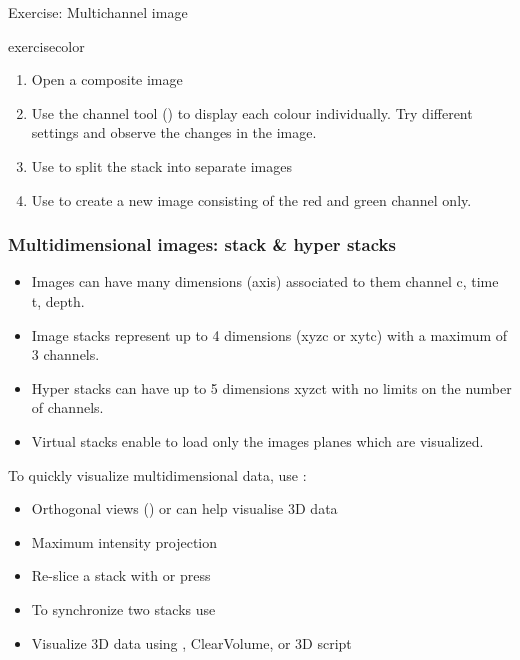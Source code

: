 \documentclass[ignorenonframetext,aspectratio=169,10pt,xcolor=table]{beamer}
\begin{document}
\begin{frame}{Exercise: Multichannel image}
  \begin{beamercolorbox}[rounded=true, shadow=true, wd=\textwidth, sep=-1em]{exercisecolor}%
    \begin{enumerate}
      \item Open a composite image 
      \item Use the channel tool () to display each colour individually. Try different settings and observe the changes in the image.
      \item Use  to split the stack into separate images
      \item Use  to create a new image consisting of the red and green channel only.
    \end{enumerate}
  \end{beamercolorbox}
\end{frame}


\begin{frame} \frametitle{Multidimensional images: stack \& hyper stacks}

  \begin{itemize} \setlength\itemsep{1em}
    \item Images can have many dimensions (axis) associated to them
          channel c, time t, depth.
    \item Image stacks represent up to 4 dimensions (xyzc or xytc) with
          a maximum of 3 channels.
    \item Hyper stacks can have up to 5 dimensions xyzct with no limits
          on the number of channels.
    \item Virtual stacks enable to load only the images planes which are
          visualized.
  \end{itemize}
  \vspace{1em}
  To quickly visualize multidimensional data, use :
  \vspace{0.5em}
  \begin{itemize}
    \vspace{1em}\item Orthogonal views () or
           can help visualise 3D data
    \item Maximum intensity projection 
    \item Re-slice a stack with  or press \keys{/}
    \item To synchronize two stacks use 
    \item Visualize 3D data using , ClearVolume, or 3D script
  \end{itemize}
\end{frame}
\end{document}
